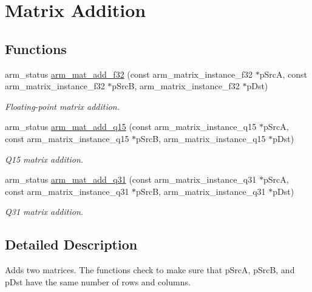 \hypertarget{group__MatrixAdd}{}\section{Matrix Addition}
\label{group__MatrixAdd}
\subsection*{Functions}
\begin{DoxyCompactItemize}
\item 
arm\+\_\+status \hyperlink{group__MatrixAdd_ga04bbf64a5f9c9e57dd1efb26a768aba1}{arm\+\_\+mat\+\_\+add\+\_\+f32} (const arm\+\_\+matrix\+\_\+instance\+\_\+f32 $\ast$p\+SrcA, const arm\+\_\+matrix\+\_\+instance\+\_\+f32 $\ast$p\+SrcB, arm\+\_\+matrix\+\_\+instance\+\_\+f32 $\ast$p\+Dst)
\begin{DoxyCompactList}\small\item\em Floating-\/point matrix addition. \end{DoxyCompactList}\item 
arm\+\_\+status \hyperlink{group__MatrixAdd_ga147e90b7c12a162735ab8824127a33ee}{arm\+\_\+mat\+\_\+add\+\_\+q15} (const arm\+\_\+matrix\+\_\+instance\+\_\+q15 $\ast$p\+SrcA, const arm\+\_\+matrix\+\_\+instance\+\_\+q15 $\ast$p\+SrcB, arm\+\_\+matrix\+\_\+instance\+\_\+q15 $\ast$p\+Dst)
\begin{DoxyCompactList}\small\item\em Q15 matrix addition. \end{DoxyCompactList}\item 
arm\+\_\+status \hyperlink{group__MatrixAdd_ga7d9d7d81a0832a17b831aad1e4a5dc16}{arm\+\_\+mat\+\_\+add\+\_\+q31} (const arm\+\_\+matrix\+\_\+instance\+\_\+q31 $\ast$p\+SrcA, const arm\+\_\+matrix\+\_\+instance\+\_\+q31 $\ast$p\+SrcB, arm\+\_\+matrix\+\_\+instance\+\_\+q31 $\ast$p\+Dst)
\begin{DoxyCompactList}\small\item\em Q31 matrix addition. \end{DoxyCompactList}\end{DoxyCompactItemize}


\subsection{Detailed Description}
Adds two matrices.  The functions check to make sure that {\ttfamily p\+SrcA}, {\ttfamily p\+SrcB}, and {\ttfamily p\+Dst} have the same number of rows and columns. 

